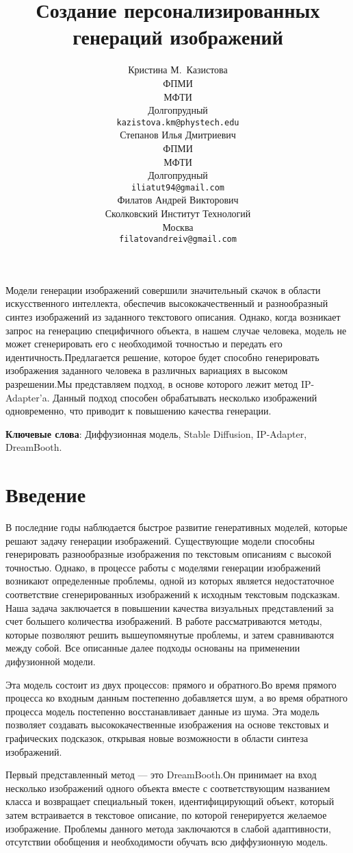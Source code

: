 \documentclass{article}
\title{Создание персонализированных генераций изображений}
\author{ Кристина М.~Казистова \\
	ФПМИ\\
	МФТИ\\
	Долгопрудный \\
	\texttt{kazistova.km@phystech.edu} \\
	\And
	Степанов Илья Дмитриевич \\
	ФПМИ\\
	МФТИ\\
	Долгопрудный \\
	\texttt{iliatut94@gmail.com} \\
    \And
	Филатов Андрей Викторович \\
	Сколковский Институт Технологий\\
	Москва \\
	\texttt{filatovandreiv@gmail.com} \\
}
\date{}
\begin{document}
\maketitle

\begin{Аннотация}
        Модели генерации изображений совершили значительный скачок в области искусственного интеллекта, обеспечив высококачественный и разнообразный синтез изображений из заданного текстового описания. Однако, когда возникает запрос на генерацию специфичного объекта, в нашем случае человека, модель не может сгенерировать его с необходимой точностью и передать его идентичность.Предлагается решение, которое будет способно генерировать изображения заданного человека в различных вариациях в высоком разрешении.Мы представляем подход, в основе которого лежит метод IP-Adapter'a. Данный подход способен обрабатывать несколько изображений одновременно, что приводит к повышению качества генерации.
\end{Аннотация}

\textbf{Ключевые слова}: Диффузионная модель, Stable Diffusion\cite{2}, IP-Adapter\cite{1}, DreamBooth\cite{3}.

\section{Введение}В последние годы наблюдается быстрое развитие генеративных моделей, которые решают задачу генерации изображений. Существующие модели способны генерировать разнообразные изображения по текстовым описаниям с высокой точностью. Однако, в процессе работы с моделями генерации изображений возникают определенные проблемы, одной из которых является недостаточное соответствие сгенерированных изображений к исходным текстовым подсказкам. Наша задача заключается в повышении качества визуальных представлений за счет большего количества изображений. В работе рассматриваются методы, которые позволяют решить вышеупомянутые проблемы, и затем сравниваются между собой. Все описанные далее подходы основаны на применении дифузионной модели\cite{2}. 

Эта модель состоит из двух процессов: прямого и обратного.Во время прямого процесса ко входным данным постепенно добавляется шум, а во время обратного процесса модель постепенно восстанавливает данные из шума. Эта модель позволяет создавать высококачественные изображения на основе текстовых и графических подсказок, открывая новые возможности в области синтеза изображений.

Первый представленный метод --- это DreamBooth\cite{3}.Он принимает на вход несколько изображений одного объекта вместе с соответствующим названием класса и возвращает специальный токен, идентифицирующий объект, который затем встраивается в текстовое описание, по которой генерируется желаемое изображение. Проблемы данного метода заключаются в слабой адаптивности, отсутствии обобщения и необходимости обучать всю диффузионную модель. 
\end{document}
